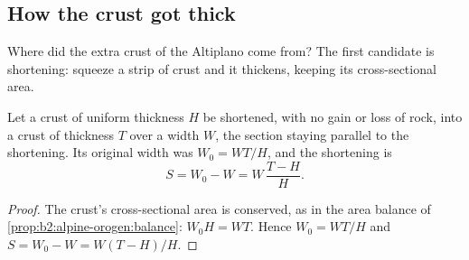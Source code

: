 \begin{omfigure}
\par{}
\end{omfigure}

\subsection{How the crust got thick}

Where did the extra crust of the Altiplano come from? The first candidate is shortening:
squeeze a strip of crust and it thickens, keeping its cross-sectional area.

\begin{proposition}\label{prop:b2:himalaya-andes:shortening}
Let a crust of uniform thickness $H$ be shortened, with no gain or loss of rock, into a crust
of thickness $T$ over a width $W$, the section staying parallel to the shortening. Its
original width was $W_0 = W T/H$, and the shortening is
\[
  S = W_0 - W = W\,\frac{T - H}{H} .
\]
\end{proposition}

\begin{proof}
The crust's cross-sectional area is conserved, as in the area balance of
\cref{prop:b2:alpine-orogen:balance}: $W_0 H = W T$. Hence $W_0 = WT/H$ and $S = W_0 - W =
W(T - H)/H$.
\end{proof}

